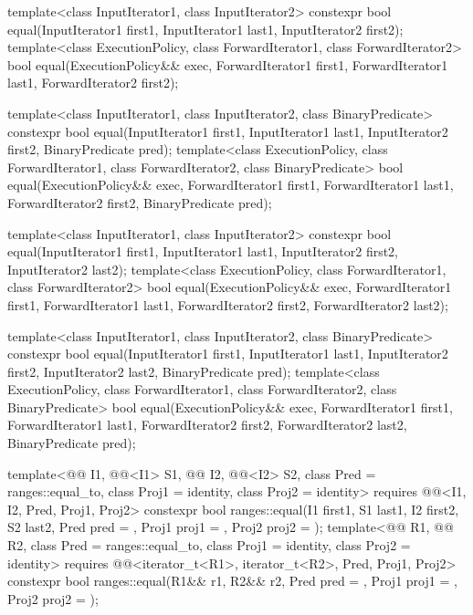 %
\begin{itemdecl}
template<class InputIterator1, class InputIterator2>
  constexpr bool equal(InputIterator1 first1, InputIterator1 last1,
                       InputIterator2 first2);
template<class ExecutionPolicy, class ForwardIterator1, class ForwardIterator2>
  bool equal(ExecutionPolicy&& exec,
             ForwardIterator1 first1, ForwardIterator1 last1,
             ForwardIterator2 first2);

template<class InputIterator1, class InputIterator2,
         class BinaryPredicate>
  constexpr bool equal(InputIterator1 first1, InputIterator1 last1,
                       InputIterator2 first2, BinaryPredicate pred);
template<class ExecutionPolicy, class ForwardIterator1, class ForwardIterator2,
         class BinaryPredicate>
  bool equal(ExecutionPolicy&& exec,
             ForwardIterator1 first1, ForwardIterator1 last1,
             ForwardIterator2 first2, BinaryPredicate pred);

template<class InputIterator1, class InputIterator2>
  constexpr bool equal(InputIterator1 first1, InputIterator1 last1,
                       InputIterator2 first2, InputIterator2 last2);
template<class ExecutionPolicy, class ForwardIterator1, class ForwardIterator2>
  bool equal(ExecutionPolicy&& exec,
             ForwardIterator1 first1, ForwardIterator1 last1,
             ForwardIterator2 first2, ForwardIterator2 last2);

template<class InputIterator1, class InputIterator2,
         class BinaryPredicate>
  constexpr bool equal(InputIterator1 first1, InputIterator1 last1,
                       InputIterator2 first2, InputIterator2 last2,
                       BinaryPredicate pred);
template<class ExecutionPolicy, class ForwardIterator1, class ForwardIterator2,
         class BinaryPredicate>
  bool equal(ExecutionPolicy&& exec,
             ForwardIterator1 first1, ForwardIterator1 last1,
             ForwardIterator2 first2, ForwardIterator2 last2,
             BinaryPredicate pred);

template<@@ I1, @@<I1> S1, @@ I2, @@<I2> S2,
         class Pred = ranges::equal_to, class Proj1 = identity, class Proj2 = identity>
  requires @@<I1, I2, Pred, Proj1, Proj2>
  constexpr bool ranges::equal(I1 first1, S1 last1, I2 first2, S2 last2,
                               Pred pred = {},
                               Proj1 proj1 = {}, Proj2 proj2 = {});
template<@@ R1, @@ R2, class Pred = ranges::equal_to,
         class Proj1 = identity, class Proj2 = identity>
  requires @@<iterator_t<R1>, iterator_t<R2>, Pred, Proj1, Proj2>
  constexpr bool ranges::equal(R1&& r1, R2&& r2, Pred pred = {},
                               Proj1 proj1 = {}, Proj2 proj2 = {});


\end{itemdecl}
